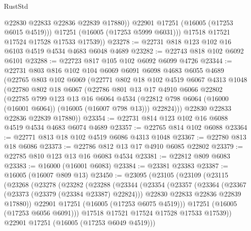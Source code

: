 \begin{lexlean}{RustStd}
\begin{coremodule}
                @22830
                @22833
                @22836
                @22839
                @17880))
            @22901
            @17251
            (@16005 (@17253 @6015 @4519)))
          @17251
          (@16005 (@17253 @5999 @6031)))
        @17518
        @17521
        @17524
        @17528
        @17533
        @17539))
@23278 := @22731 @818 @123 @102 @16 @6103 @4519 @4534 @4683 @6048 @4689
@23282 := @22743 @818 @102 @6092 @6101
@23288 := @22723 @817 @105 @102 @6092 @6099 @4726
@23344 := @22731
    @803
    @816
    @102
    @104
    @6069
    @6091
    @6098
    @4683
    @6055
    @4689
    (@22765
      @803
      @102
      @6069
      (@22771
        @802
        @18
        @102
        @4519
        @6067
        @4313
        @1048
        (@22780
          @802
          @18
          @6067
          (@22786
            @801
            @13
            @17
            @4910
            @6066
            @22802
            (@22785
              @799
              @123
              @13
              @16
              @6064
              @4534
              (@22812 @798 @6064 (@16000 (@16001 @6064)) (@16005 (@16007 @798 @13)))
              @22824)))
        @22830
        @22833
        @22836
        @22839
        @17880))
@23354 := @22731 @814 @123 @102 @16 @6088 @4519 @4534 @4683 @6074 @4689
@23357 := @22765 @814 @102 @6088
@23364 := @22771 @813 @18 @102 @4519 @6086 @4313 @1048
@23367 := @22780 @813 @18 @6086
@23373 := @22786 @812 @13 @17 @4910 @6085 @22802
@23379 := @22785 @810 @123 @13 @16 @6083 @4534
@23381 := @22812 @809 @6083
@23383 := @16000 (@16001 @6083)
@23384 := @23381 @23383
@23387 := @16005 (@16007 @809 @13)
@23450 := @23095
    (@23105
      (@23109
        (@23115
          (@23268
            (@23278
              (@23282
                (@23288
                  (@23344
                    (@23354
                      (@23357
                        (@23364
                          (@23367 (@23373 (@23379 (@23384 @23387) @22824)))
                          @22830
                          @22833
                          @22836
                          @22839
                          @17880))
                      @22901
                      @17251
                      (@16005 (@17253 @6075 @4519)))
                    @17251
                    (@16005 (@17253 @6056 @6091)))
                  @17518
                  @17521
                  @17524
                  @17528
                  @17533
                  @17539))
              @22901
              @17251
              (@16005 (@17253 @6049 @4519)))

\end{coremodule}
\end{lexlean}
